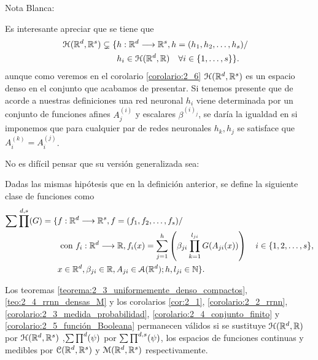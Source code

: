 \textcolor{dark_green}{Nota Blanca: }


Es interesante apreciar que se tiene que 
    \begin{equation} \label{eq:diferencia_conjuntos_multicapa}
        \begin{split}
        \mathcal{H}(\mathbb{R}^d,\mathbb{R}^s) \subsetneq
        \{ 
            & h: \mathbb{R} ^d \longrightarrow \mathbb{R}^s, h= (h_1, h_2, \ldots, h_s)  / \quad 
            \\ &
            h_i \in \mathcal{H}(\mathbb{R}^d,\mathbb{R}) \quad \forall i \in \{1, \ldots, s\}
        \}.
        \end{split}
    \end{equation}
    aunque como veremos en el corolario \ref{corolario:2_6} $\mathcal{H}(\mathbb{R}^d,\mathbb{R}^s)$ es un espacio denso en el conjunto que acabamos de presentar. 
    Si tenemos presente que de acorde a nuestras definiciones una red neuronal $h_i$ viene determinada por un conjunto de funciones afines $A^{(i)}_j$  y escalares $\beta^{(i)_j}$, se daría la igualdad en  si imponemos que para cualquier par de redes neuronales $h_k, h_j$ se satisface que $A^{(k)}_i = A^{(j)}_i$. 


No es difícil pensar que su versión generalizada sea: 

\begin{definicion} 
    Dadas las mismas hipótesis que en la definición anterior, se define la siguiente clase de funciones como 
    \begin{equation}
        \begin{split}
            \sum \prod^{d, s}(G) 
            = 
        \{ 
            & f: \mathbb{R} ^d \longrightarrow \mathbb{R}^s, f= (f_1, f_2, \ldots , f_s)  / \quad 
            \\ &
            \text{ con } f_i : \mathbb{R} ^d\longrightarrow \mathbb{R}, 
            f_i(x)=\sum_{j = 1} ^h 
            \left(
            \beta_{j i} \prod_{k=1}^{l_{j i}} G(A_{j i}(x))
            \right)
             \quad i \in \{1,2,\ldots, s\}, \\
            & x \in \mathbb{R} ^d, \beta_{j i} \in \mathbb{R}, A_{j i}\in \mathcal{A}(\mathbb{R}^d); h,l_{j i} \in \mathbb{N} 
        \}.
        \end{split}
    \end{equation}
\end{definicion}


\begin{corolario}\label{corolario:2_6}
    Los teoremas 
    \ref{teorema:2_3_uniformemente_denso_compactos},
    \ref{teo:2_4_rrnn_densas_M} 
    y los corolarios
    \ref{cor:2_1}, 
    \ref{corolario:2_2_rrnn},
    \ref{corolario:2_3_medida_probabilidad},
    \ref{corolario:2_4_conjunto_finito}
    y 
    \ref{corolario:2_5_función_Booleana}
    permanecen válidos si se sustituye $\mathcal{H}(\mathbb{R}^d,\mathbb{R})$ por $\mathcal{H}(\mathbb{R}^d,\mathbb{R}^s)$
    ,$\sum \prod^d (\psi)$ por $\sum \prod^{d,s} (\psi)$, 
    los espacios de funciones continuas y medibles por $\mathcal{C}(\mathbb{R}^d ,\mathbb{R}^s)$ y $\mathcal{M}(\mathbb{R}^d , \mathbb{R}^s)$ respectivamente.
\end{corolario}

